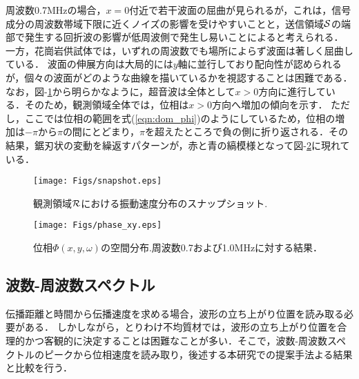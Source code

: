 周波数0.7MHzの場合，$x=0$付近で若干波面の屈曲が見られるが，これは，信号成分の周波数帯域下限に近くノイズの影響を受けやすいことと，送信領域$\cal S$の端部で発生する回折波の影響が低周波側で発生し易いことによると考えられる．
一方，花崗岩供試体では，いずれの周波数でも場所によらず波面は著しく屈曲している．
波面の伸展方向は大局的には$y$軸に並行しており配向性が認められるが，個々の波面がどのような曲線を描いているかを視認することは困難である．なお，図-\ref{fig:fig5}から明らかなように，超音波は全体として$x>0$方向に進行している．そのため，観測領域全体では，位相は$x>0$方向へ増加の傾向を示す．
ただし，ここでは位相の範囲を式(\ref{eqn:dom_phi})のようにしているため，位相の増加は$-\pi$から$\pi$の間にとどまり，$\pi$を超えたところで負の側に折り返される．その結果，鋸刃状の変動を繰返すパターンが，赤と青の縞模様となって図-\ref{fig:fig6}に現れている．
\begin{figure}
\begin{center}
	\texttt{[image: Figs/snapshot.eps]}
\caption{
	観測領域${\cal R}$における振動速度分布のスナップショット.
}
\label{fig:fig5}
\end{center}
	\vspace{-5mm}
\end{figure}
\begin{figure}
\begin{center}
	\texttt{[image: Figs/phase\_xy.eps]}
	\caption{位相$\Phi(x,y,\omega)$の空間分布.周波数0.7および1.0MHzに対する結果．}
	\label{fig:fig6}
\end{center}
	\vspace{-10mm}
\end{figure}
\subsection{波数-周波数スペクトル}
伝播距離と時間から伝播速度を求める場合，波形の立ち上がり位置を読み取る必要がある．
しかしながら，とりわけ不均質材では，波形の立ち上がり位置を合理的かつ客観的に決定することは困難なことが多い．そこで，波数-周波数スペクトルのピークから位相速度を読み取り，後述する本研究での提案手法よる結果と比較を行う．

